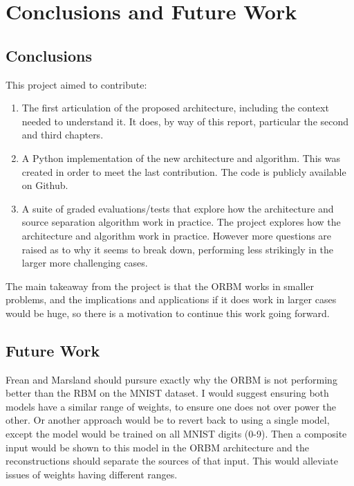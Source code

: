 \chapter{Conclusions and Future Work}

\section{Conclusions}

This project aimed to contribute:
\begin{enumerate}[$\mathcal{C}$1.]
  \item The first articulation of the proposed architecture, including the context needed to understand it. It does, by way of this report, particular the second and third chapters.
  \item A Python implementation of the new architecture and algorithm. This was created in order to meet the last contribution. The code is publicly available on Github.
  \item A suite of graded evaluations/tests that explore how the architecture and source separation algorithm work in practice. The project explores how the architecture and algorithm work in practice. However more questions are raised as to why it seems to break down, performing less strikingly in the larger more challenging cases.
\end{enumerate}

The main takeaway from the project is that the ORBM works in smaller problems, and the implications and applications if it does work in larger cases would be huge, so there is a motivation to continue this work going forward.

\section{Future Work}

Frean and Marsland should pursure exactly why the ORBM is not performing better than the RBM on the MNIST dataset. I would suggest ensuring both models have a similar range of weights, to ensure one does not over power the other. Or another approach would be to revert back to using a single model, except the model would be trained on all MNIST digits (0-9). Then a composite input would be shown to this model in the ORBM architecture and the reconstructions should separate the sources of that input. This would alleviate issues of weights having different ranges.
